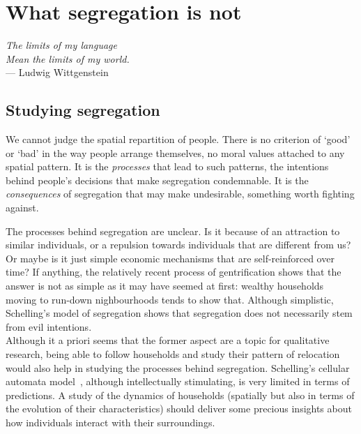 \chapter{What segregation is not}

\begin{flushright}{\slshape    
The limits of my language\\
Mean the limits of my world.} \\ \medskip
--- Ludwig Wittgenstein~\cite{Wittgenstein:1998}
\end{flushright}


\bigskip


\newcommand{\E}{\mathrm{E}}
\newcommand{\Var}{\mathrm{Var}}

\section{Studying segregation}
\label{sec:studying_segregation}


We cannot judge the spatial repartition of people. There is no criterion of
`good' or `bad' in the way people arrange themselves, no moral values attached
to any spatial pattern. It is the \emph{processes} that lead to such patterns,
the intentions behind people's decisions that make segregation condemnable. It
is the \emph{consequences} of segregation that may make undesirable, something
worth fighting against. 

The processes behind segregation are unclear. Is it
because of an attraction to similar individuals, or a repulsion towards
individuals that are different from us? Or maybe is it just simple economic
mechanisms that are self-reinforced over time? If anything, the relatively
recent process of gentrification shows that the answer is not as simple as it
may have seemed at first: wealthy households moving to run-down nighbourhoods
tends to show that. Although simplistic, Schelling's model of segregation shows
that segregation does not necessarily stem from evil intentions.\\
Although it a priori seems that
the former aspect are a topic for qualitative research, being able to follow
households and study their pattern of relocation would also help in studying
the processes behind segregation. Schelling's cellular automata
model~\cite{Schelling:1971}, although intellectually stimulating, is very
limited in terms of predictions. A study of the dynamics of households
(spatially but also in terms of the evolution of their characteristics) should
deliver some precious insights about how individuals interact with their
surroundings.

